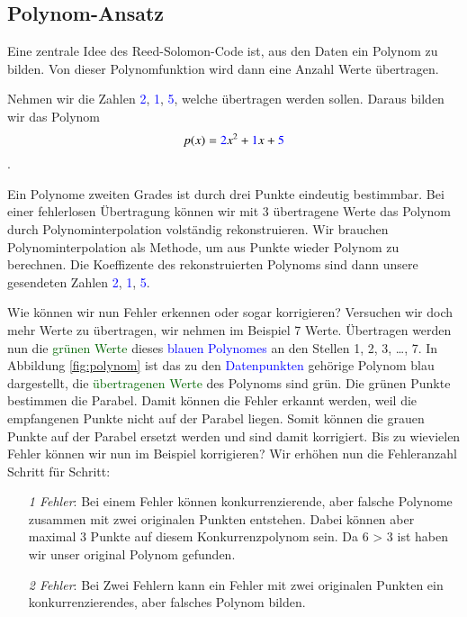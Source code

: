 \subsection{Polynom-Ansatz
\label{reedsolomon:section:polynomansatz}}
Eine zentrale Idee des Reed-Solomon-Code ist, aus den Daten ein Polynom zu bilden. 
Von dieser Polynomfunktion wird dann eine Anzahl Werte übertragen.
\begin{beispiel} Nehmen wir die Zahlen \textcolor{blue}{2}, \textcolor{blue}{1}, \textcolor{blue}{5},
    welche übertragen werden sollen. Daraus bilden wir das Polynom
\begin{equation}
p(x)
=
\textcolor{blue}{2}x^2 + \textcolor{blue}{1}x + \textcolor{blue}{5}
\label{reedsolomon:equation1}
\end{equation}.
\par 
Ein Polynome zweiten Grades ist durch drei Punkte eindeutig bestimmbar. 
Bei einer fehlerlosen Übertragung können wir mit 3 übertragene Werte
    das Polynom durch Polynominterpolation volständig rekonstruieren.
Wir brauchen Polynominterpolation als Methode, um aus Punkte wieder Polynom zu berechnen.
Die Koeffizente des rekonstruierten Polynoms sind dann unsere gesendeten Zahlen \textcolor{blue}{2}, \textcolor{blue}{1}, \textcolor{blue}{5}.
\par 
Wie können wir nun Fehler erkennen oder sogar korrigieren?
Versuchen wir doch mehr Werte zu übertragen, wir nehmen im Beispiel 7 Werte.
Übertragen werden nun die \textcolor{darkgreen}{grünen Werte} 
    dieses \textcolor{blue}{blauen Polynomes} an den Stellen 1, 2, 3, \dots , 7.
In Abbildung \ref{fig:polynom} ist das zu den \textcolor{blue}{Datenpunkten} gehörige Polynom blau dargestellt,
    die \textcolor{darkgreen}{übertragenen Werte} des Polynoms sind grün.
Die grünen Punkte bestimmen die Parabel. 
Damit können die Fehler erkannt werden, weil die empfangenen Punkte nicht auf der Parabel liegen.
Somit können die grauen Punkte auf der Parabel ersetzt werden und sind damit korrigiert.
Bis zu wievielen Fehler können wir nun im Beispiel korrigieren?
Wir erhöhen nun die Fehleranzahl Schritt für Schritt:
\begin{itemize}
    \item[\textit{1 Fehler}:] Bei einem Fehler können konkurrenzierende, aber falsche Polynome zusammen mit zwei originalen Punkten entstehen.
        Dabei können aber maximal 3 Punkte auf diesem Konkurrenzpolynom sein.
        Da 6 > 3 ist haben wir unser original Polynom gefunden.
    \item[\textit{2 Fehler}:] Bei Zwei Fehlern kann ein Fehler mit zwei originalen Punkten ein konkurrenzierendes, aber falsches Polynom bilden.

\end{itemize}
\end{beispiel}
